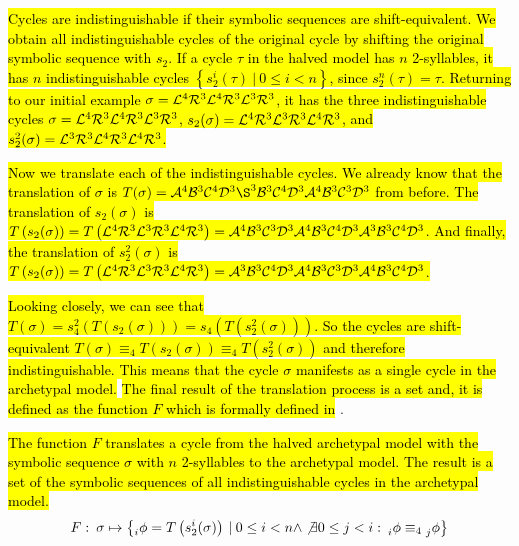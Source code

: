 \hl{
	Cycles are indistinguishable if their symbolic sequences are shift-equivalent.
	We obtain all indistinguishable cycles of the original cycle by shifting the original symbolic sequence with $s_2$.
	If a cycle $\tau$ in the halved model has $n$ 2-syllables, it has $n$ indistinguishable cycles $\left\{s_2^i(\tau) \:|\: 0 \leq i < n\right\}$, since $s_2^n(\tau) = \tau$.
	Returning to our initial example $\sigma = \mathcal{L}^4\mathcal{R}^3\mathcal{L}^4\mathcal{R}^3\mathcal{L}^3\mathcal{R}^3$, it has the three indistinguishable cycles $\sigma = \mathcal{L}^4\mathcal{R}^3\mathcal{L}^4\mathcal{R}^3\mathcal{L}^3\mathcal{R}^3$, $s_2(\sigma) = \mathcal{L}^4\mathcal{R}^3\mathcal{L}^3\mathcal{R}^3\mathcal{L}^4\mathcal{R}^3$, and $s_2^2(\sigma) = \mathcal{L}^3\mathcal{R}^3\mathcal{L}^4\mathcal{R}^3\mathcal{L}^4\mathcal{R}^3$.
}

\hl{
	Now we translate each of the indistinguishable cycles.
	We already know that the translation of $\sigma$ is $T(\sigma) = \A^4\B^3\C^4\D^3\S^3\B^3\C^4\D^3\A^4\B^3\C^3\D^3$ from before.
	The translation of $s_2(\sigma)$ is $T\left(s_2(\sigma)\right) = T\left(\mathcal{L}^4\mathcal{R}^3\mathcal{L}^3\mathcal{R}^3\mathcal{L}^4\mathcal{R}^3\right) = \mathcal{A}^4\mathcal{B}^3\mathcal{C}^3\mathcal{D}^3\mathcal{A}^4\mathcal{B}^3\mathcal{C}^4\mathcal{D}^3\mathcal{A}^3\mathcal{B}^3\mathcal{C}^4\mathcal{D}^3$.
	And finally, the translation of $s_2^2(\sigma)$ is $T\left(s_2(\sigma)\right) = T\left(\mathcal{L}^4\mathcal{R}^3\mathcal{L}^3\mathcal{R}^3\mathcal{L}^4\mathcal{R}^3\right) = \mathcal{A}^3\mathcal{B}^3\mathcal{C}^4\mathcal{D}^3\mathcal{A}^4\mathcal{B}^3\mathcal{C}^3\mathcal{D}^3\mathcal{A}^4\mathcal{B}^3\mathcal{C}^4\mathcal{D}^3$.
}

\hl{
	Looking closely, we can see that $T(\sigma) = s_4^2\left(T\left(s_2(\sigma)\right)\right) = s_4\left(T\left(s_2^2(\sigma)\right)\right)$.
	So the cycles are shift-equivalent $T(\sigma) \equiv_4 T\left(s_2(\sigma)\right) \equiv_4 T\left(s_2^2(\sigma)\right)$ and therefore indistinguishable.
	This means that the cycle $\sigma$ manifests as a single cycle in the archetypal model.
}
\hl{The final result of the translation process is a set and, it is defined as the function $F$ which is formally defined in} .

\begin{definition}
	\label{def:F}
	\hl{
		The function $F$ translates a cycle from the halved archetypal model with the symbolic sequence $\sigma$ with $n$ 2-syllables to the archetypal model.
		The result is a set of the symbolic sequences of all indistinguishable cycles in the archetypal model.
	}
	\begin{align}
		F:\: \sigma \mapsto \left\{
		\prescript{}{i}{\phi} = T\left(s_2^i(\sigma)\right) \:|\:
		0 \leq i < n \land
		\not\exists 0 \leq j < i:\: \prescript{}{i}{\phi} \equiv_4 \prescript{}{j}{\phi}
		\right\}
	\end{align}
\end{definition}

